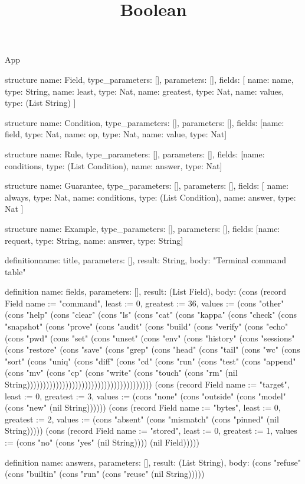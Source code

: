 \begin{lexlean}{App}
\title{Boolean}
\begin{semanticmodule}
structure{
  name: Field,
  type_parameters: [],
  parameters: [],
  fields: [
    {name: name, type: String},
    {name: least, type: Nat},
    {name: greatest, type: Nat},
    {name: values, type: (List String)}
  ]
}

structure{
  name: Condition,
  type_parameters: [],
  parameters: [],
  fields: [{name: field, type: Nat}, {name: op, type: Nat}, {name: value, type: Nat}]
}

structure{
  name: Rule,
  type_parameters: [],
  parameters: [],
  fields: [{name: conditions, type: (List Condition)}, {name: answer, type: Nat}]
}

structure{
  name: Guarantee,
  type_parameters: [],
  parameters: [],
  fields: [
    {name: always, type: Nat},
    {name: conditions, type: (List Condition)},
    {name: answer, type: Nat}
  ]
}

structure{
  name: Example,
  type_parameters: [],
  parameters: [],
  fields: [{name: request, type: String}, {name: answer, type: String}]
}

definition{name: title, parameters: [], result: String, body: "Terminal command table"}

definition{
  name: fields,
  parameters: [],
  result: (List Field),
  body: (cons (record Field {name := "command", least := 0, greatest := 36, values := (cons "other" (cons "help" (cons "clear" (cons "ls" (cons "cat" (cons "kappa" (cons "check" (cons "snapshot" (cons "prove" (cons "audit" (cons "build" (cons "verify" (cons "echo" (cons "pwd" (cons "set" (cons "unset" (cons "env" (cons "history" (cons "sessions" (cons "restore" (cons "save" (cons "grep" (cons "head" (cons "tail" (cons "wc" (cons "sort" (cons "uniq" (cons "diff" (cons "cd" (cons "run" (cons "test" (cons "append" (cons "mv" (cons "cp" (cons "write" (cons "touch" (cons "rm" (nil String))))))))))))))))))))))))))))))))))))))}) (cons (record Field {name := "target", least := 0, greatest := 3, values := (cons "none" (cons "outside" (cons "model" (cons "new" (nil String)))))}) (cons (record Field {name := "bytes", least := 0, greatest := 2, values := (cons "absent" (cons "mismatch" (cons "pinned" (nil String))))}) (cons (record Field {name := "stored", least := 0, greatest := 1, values := (cons "no" (cons "yes" (nil String)))}) (nil Field)))))
}

definition{
  name: answers,
  parameters: [],
  result: (List String),
  body: (cons "refuse" (cons "builtin" (cons "run" (cons "reuse" (nil String)))))
}


\end{semanticmodule}
\end{lexlean}
